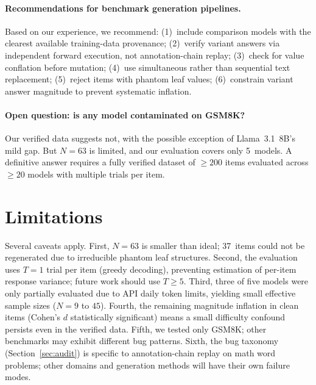 \paragraph{Recommendations for benchmark generation pipelines.}
Based on our experience, we recommend: (1)~include comparison models
with the clearest available training-data provenance; (2)~verify variant
answers via independent forward execution, not annotation-chain
replay; (3)~check for value conflation before mutation; (4)~use
simultaneous rather than sequential text replacement; (5)~reject
items with phantom leaf values; (6)~constrain variant answer
magnitude to prevent systematic inflation.

\paragraph{Open question: is any model contaminated on GSM8K?}
Our verified data suggests not, with the possible exception of
Llama~3.1~8B's mild gap. But $N = 63$ is limited,
and our evaluation covers only 5~models. A definitive answer
requires a fully verified
dataset of $\geq 200$ items evaluated across $\geq 20$ models with
multiple trials per item.


\section{Limitations}
\label{sec:limitations}

Several caveats apply. First, $N = 63$ is smaller than ideal; 37~items
could not be regenerated due to irreducible phantom leaf structures.
Second, the evaluation uses $T = 1$ trial per item (greedy decoding),
preventing estimation of per-item response variance; future work
should use $T \geq 5$. Third, three of five models were only partially
evaluated due to API daily token limits, yielding small effective
sample sizes ($N = 9$ to $45$). Fourth, the remaining magnitude
inflation in clean items (Cohen's $d$ statistically significant)
means a small difficulty confound persists even in the verified data.
Fifth, we tested only GSM8K; other benchmarks may exhibit different
bug patterns. Sixth, the bug taxonomy (Section~\ref{sec:audit}) is
specific to annotation-chain replay on math word problems; other
domains and generation methods will have their own failure modes.
